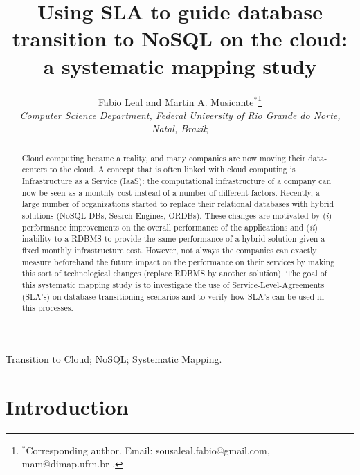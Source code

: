 \documentclass[]{tEIS2e}
\theoremstyle{plain}
\theoremstyle{remark}
\begin{document}

\title{Using SLA to guide database transition to NoSQL on the cloud: a systematic mapping study}

\author{Fabio Leal and Martin A. Musicante$^{\ast}$\thanks{$^\ast$Corresponding author. Email: sousaleal.fabio@gmail.com, mam@dimap.ufrn.br .
\vspace{6pt}}\\\vspace{6pt} {\em{Computer Science Department, Federal University of Rio Grande do Norte, Natal, Brazil}};
\\ }

\maketitle  




\begin{abstract}
Cloud computing became a reality, and many companies are now moving their data-centers to the cloud. 
A concept that is often linked with cloud computing is Infrastructure as a Service (IaaS): the computational infrastructure of a company can now be seen as a monthly cost instead of a number of different factors. 
Recently, a large number of organizations started to replace their relational databases with hybrid solutions (NoSQL DBs, Search Engines, ORDBs). 
These changes are motivated by (\textit{i}) performance improvements on the overall performance of the applications and (\textit{ii}) inability to a RDBMS to provide the same performance of a hybrid solution given a fixed monthly infrastructure cost. 
However, not always the companies can exactly measure beforehand the future impact on the performance on their services by making this sort of technological changes (replace RDBMS by another solution). 
The goal of this systematic mapping study is to investigate the use of Service-Level-Agreements (SLA’s) on database-transitioning scenarios and to verify how SLA’s can be used in this processes.
\end{abstract}

\begin{keywords}
Transition to Cloud; NoSQL; Systematic Mapping.
\end{keywords}

\section{Introduction}
\end{document}
